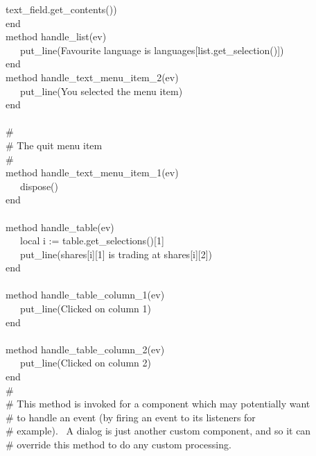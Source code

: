 {{\textbar}{\textbar} text\_field.get\_contents()) \\
\>   end \\
\>   method handle\_list(ev) \\
\>   \ \ \ put\_line({\textquotedbl}Favourite language is
{\textquotedbl} {\textbar}{\textbar} languages[list.get\_selection()]) \\
\>   end \\
\>   method handle\_text\_menu\_item\_2(ev) \\
\>   \ \ \ put\_line({\textquotedbl}You selected the menu
item{\textquotedbl}) \\
\>   end \\
\ \\
\>   \# \\
\>   \# The quit menu item \\
\>   \# \\
\>   method handle\_text\_menu\_item\_1(ev) \\
\>   \ \ \ dispose() \\
\>   end \\
\ \\
\>   method handle\_table(ev) \\
\>   \ \ \ local i := table.get\_selections()[1] \\
\>   \ \ \ put\_line(shares[i][1] {\textbar}{\textbar} {\textquotedbl}
is trading at {\textquotedbl} {\textbar}{\textbar} shares[i][2]) \\
\>   end \\
\ \\
\>   method handle\_table\_column\_1(ev) \\
\>   \ \ \ put\_line({\textquotedbl}Clicked on column
1{\textquotedbl}) \\
\>   end \\
\ \\
\>   method handle\_table\_column\_2(ev) \\
\>   \ \ \ put\_line({\textquotedbl}Clicked on column
2{\textquotedbl}) \\
\>   end
\ \\
\>   \# \\
\>   \# This method is invoked for a component which may potentially want \\
\>   \# to handle an event (by firing an event to its listeners for\\
\>   \# example). \ A dialog is just another custom component, and so it can\\
\>   \# override this method to do any custom processing. \\
}
